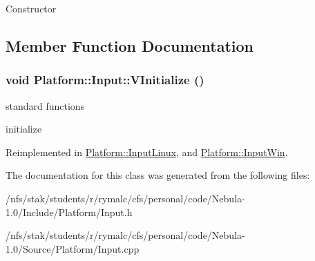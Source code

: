 Constructor 

\subsection{Member Function Documentation}
\hypertarget{classPlatform_1_1Input_acc69f9603dbb49644d2c6f4653f4b64f}{
\subsubsection[{VInitialize}]{\setlength{\rightskip}{0pt plus 5cm}void Platform::Input::VInitialize ()}}
\label{classPlatform_1_1Input_acc69f9603dbb49644d2c6f4653f4b64f}
standard functions

initialize 

Reimplemented in \hyperlink{classPlatform_1_1InputLinux_a7197f730a72f6ff7c3f8e98705cfe922}{Platform::InputLinux}, and \hyperlink{classPlatform_1_1InputWin_ac20987578bd3d2e52b4df659bf18935b}{Platform::InputWin}.

The documentation for this class was generated from the following files:\begin{DoxyCompactItemize}
\item 
/nfs/stak/students/r/rymalc/cfs/personal/code/Nebula-\/1.0/Include/Platform/Input.h\item 
/nfs/stak/students/r/rymalc/cfs/personal/code/Nebula-\/1.0/Source/Platform/Input.cpp\end{DoxyCompactItemize}
